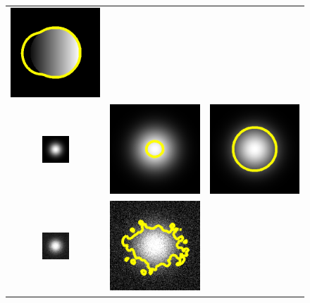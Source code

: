 \begin{figure}[tb]
\begin{tabular}{@{}ccc@{}}
\includegraphics[height=0.3\textwidth]{images/demo/GACvsCV/CV_inhom}	\\
\includegraphics[width=0.3\textwidth]{images/demo/GACvsCV/gauss}	&
\includegraphics[height=0.3\textwidth]{images/demo/GACvsCV/GAC_gauss}	&
\includegraphics[height=0.3\textwidth]{images/demo/GACvsCV/CV_gauss}	\\
\includegraphics[width=0.3\textwidth]{images/demo/GACvsCV/gauss_noisy}	&
\includegraphics[height=0.3\textwidth]{images/demo/GACvsCV/GAC_gauss_noisy}	&

\end{tabular}
\end{figure}
